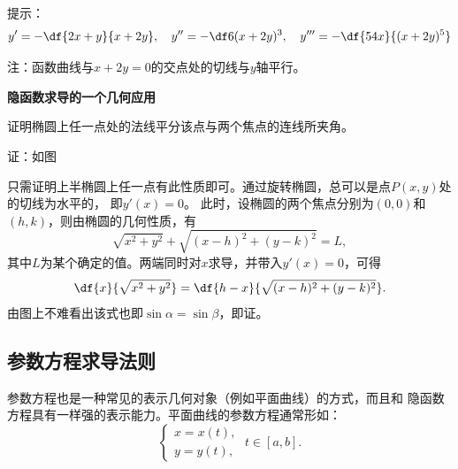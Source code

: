 提示：
$$y'=-\df{2x+y}{x+2y},\quad y''=-\df6{(x+2y)^3},\quad
y'''=-\df{54x}{(x+2y)^5}$$

注：函数曲线与$x+2y=0$的交点处的切线与$y$轴平行。

\begin{shaded}
	{\bf 隐函数求导的一个几何应用}
	
	\egz 证明椭圆上任一点处的法线平分该点与两个焦点的连线所夹角。

	证：如图
	\begin{center}
	\end{center}
	只需证明上半椭圆上任一点有此性质即可。通过旋转椭圆，总可以是点$P(x,y)$处的切线为水平的，
	即$y'(x)=0$。
	此时，设椭圆的两个焦点分别为$(0,0)$和$(h,k)$，则由椭圆的几何性质，有
	$$\sqrt{x^2+y^2}+\sqrt{(x-h)^2+(y-k)^2}=L,$$
	其中$L$为某个确定的值。两端同时对$x$求导，并带入$y'(x)=0$，可得
	$$\df{x}{\sqrt{x^2+y^2}}=\df{h-x}{\sqrt{(x-h)^2+(y-k)^2}}.$$
	由图上不难看出该式也即$\sin\alpha=\sin\beta$，即证。
	\fin
\end{shaded}

\subsection{参数方程求导法则}

参数方程也是一种常见的表示几何对象（例如平面曲线）的方式，而且和
隐函数方程具有一样强的表示能力。平面曲线的参数方程通常形如：
$$
	\left\{\begin{array}{l}
		x=x(t),\\
		y=y(t),
	\end{array}\right.\;t\in [a,b].
$$

